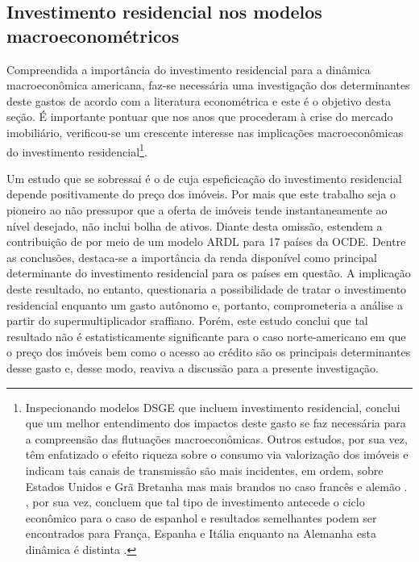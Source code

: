 \subsection{Investimento residencial nos modelos macroeconométricos}\label{RevEmpirica}

Compreendida a importância do investimento residencial para a dinâmica macroeconômica americana, faz-se necessária uma investigação dos determinantes deste gastos de acordo com a literatura econométrica e este é o objetivo desta seção. 
É importante pontuar que nos anos que procederam à crise do mercado imobiliário, verificou-se um crescente interesse nas implicações macroeconômicas do investimento residencial\footnote{Inspecionando modelos DSGE que incluem investimento residencial, \textcite{iacoviello_housing_2010} conclui que um melhor entendimento dos impactos deste gasto se faz necessária para a compreensão das flutuações macroeconômicas. Outros estudos, por sua vez, têm enfatizado o efeito riqueza sobre o consumo via valorização dos imóveis e indicam tais canais de transmissão são mais incidentes, em ordem, sobre Estados Unidos e Grã Bretanha mas mais brandos no caso francês e alemão \cites{sastre_assessment_2010}{chauvin_wealth_2010}{bassanetti_effects_2010}{arrondel_housing_2010}. 
	\textcite{alvarez_does_2010}, por sua vez, concluem que tal tipo de investimento antecede o ciclo econômico para o caso de espanhol e resultados semelhantes podem ser encontrados para França, Espanha  e Itália enquanto na Alemanha esta dinâmica é distinta \cites{ferrara_common_2010}{ferrara_cyclical_2010}.}. 

Um estudo que se sobressai é o de \textcite{poterba_tax_1984}  cuja espeficicação do investimento residencial depende positivamente do preço dos imóveis. 
Por mais que este trabalho seja o pioneiro ao não pressupor que a oferta de imóveis tende instantaneamente ao nível desejado, não inclui bolha de ativos.
Diante desta omissão, 
\textcite{arestis_residential_2015} estendem a contribuição de 
\textcite{poterba_tax_1984} por meio de um modelo ARDL para 17 países da OCDE. 
Dentre as conclusões, destaca-se a importância da renda disponível como principal determinante do investimento residencial para os países em questão.  A implicação deste resultado, no entanto, questionaria a possibilidade de tratar o investimento residencial enquanto um gasto autônomo e, portanto, comprometeria a análise a partir do supermultiplicador sraffiano. Porém, este estudo conclui que tal resultado não é estatisticamente significante para o caso norte-americano em que o preço dos imóveis bem como o acesso ao crédito são os principais determinantes desse gasto e, desse modo, reaviva a discussão para a presente investigação.


